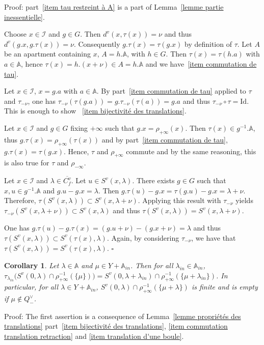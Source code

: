 \documentclass[12pt]{article}
\theoremstyle{plain}
\newtheorem{cor}[thm]{Corollary}
\theoremstyle{definition}
\newcommand{\A}{\mathbb{A}}
\newcommand{\I}{\mathcal{I}}
\newcommand{\Id}{\mathrm{Id}}
\begin{document}
Proof: part~\ref{item tau restreint à A} is a part of Lemma~\ref{lemme partie inessentielle}.


Choose $x\in \I$ and $g\in G$. Then $d^v(x,\tau(x))=\nu$ and thus $d^v(g.x,g.\tau(x))=\nu$. Consequently $g.\tau(x)=\tau(g.x)$ by definition of $\tau$. Let $A$ be an apartment containing $x$, $A=h.\A$, with $h\in G$. Then $\tau(x)=\tau(h.a)$ with $a\in \A$, hence $\tau(x)=h.(x+\nu)\in A=h.\A$ and we have~\ref{item commutation de tau}.

Let $x\in\I$, $x=g.a$ with $a\in \A$. By part~\ref{item commutation de tau} applied to $\tau$ and $\tau_{-\nu}$, one has $\tau_{-\nu}(\tau(g.a))=g.\tau_{-\nu}(\tau(a))=g.a$ and thus $\tau_{-\nu}\circ\tau=\Id$. This is enough to show ~\ref{item bijectivité des translations}.

Let $x\in \I$ and $g\in G$ fixing $+\infty$ such that $g.x=\rho_{+\infty}(x)$. 
Then $\tau(x)\in g^{-1}.\A$, thus $g.\tau(x)=\rho_{+\infty}(\tau(x))$ and by
 part~\ref{item commutation de tau}, $g.\tau(x)=\tau(g.x)$. Hence, $\tau$ and
  $\rho_{+\infty}$ commute and by the same reasoning, this is also true for $\tau$ and $\rho_{-\infty}$.

Let $x\in\I$ and $\lambda\in \overline{C_f^v}$. Let $u\in S^v(x,\lambda)$. There exists $g\in G$ such that $x,u\in g^{-1}.\A$ and $g.u-g.x=\lambda$. Then $g.\tau(u)-g.x=\tau(g.u)-g.x=\lambda+\nu$. Therefore, $\tau(S^v(x,\lambda))\subset S^v(x,\lambda+\nu)$. Applying this result with $\tau_{-\nu}$ yields $\tau_{-\nu}(S^v(x,\lambda+\nu))\subset S^v(x,\lambda)$ and thus $\tau(S^v(x,\lambda))=S^v(x,\lambda+\nu)$.

One has $g.\tau(u)-g.\tau(x)=(g.u+\nu)-(g.x+\nu)=\lambda$ and thus $\tau(S^v(x,\lambda))\subset S^v(\tau(x),\lambda)$. Again, by considering $\tau_{-\nu}$, we have that $\tau(S^v(x,\lambda))=S^v(\tau(x),\lambda)$. $\square$


 
 
\begin{cor}\label{cor finitude des boules}
Let $\lambda\in \A$ and $\mu\in Y+\A_{in}$. Then for all $\lambda_{in}\in \A_{in}$, $\tau_{\lambda_{in}}\big(S^v(0,\lambda)\cap \rho_{+\infty}^{-1}(\{\mu\})\big)=S^v(0,\lambda+\lambda_{in})\cap \rho_{+\infty}^{-1}(\{\mu+\lambda_{in}\})$. In particular, for all $\lambda\in Y+\A_{in}$, $S^v(0,\lambda)\cap \rho_{+\infty}^{-1}(\{\mu+\lambda\})$ is finite and is empty if $\mu\notin Q^\vee_-$.

\end{cor}

Proof: The first assertion is a consequence of Lemma~\ref{lemme propriétés des translations} part~\ref{item bijectivité des translations}, \ref{item commutation translation retraction} and \ref{item translation d'une boule}.
\end{document}
